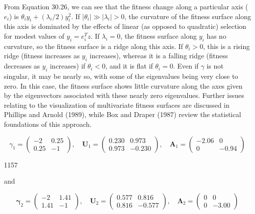 \documentclass{article}
\begin{document}
From Equation 30.26, we can see that the fitness change along a particular axis ( $ e_i $) is  $ \theta_i y_i + (\lambda_i / 2) y_i^2 $. If  $ |\theta_i| \gg |\lambda_i| > 0 $, the curvature of the fitness surface along this axis is dominated by the effects of linear (as opposed to quadratic) selection for modest values of  $ y_i = e_i^T z $. If  $ \lambda_i = 0 $, the fitness surface along  $ y_i $ has no curvature, so the fitness surface is a ridge along this axis. If  $ \theta_i > 0 $, this is a rising ridge (fitness increases as  $ y_i $ increases), whereas it is a falling ridge (fitness decreases as  $ y_i $ increases) if  $ \theta_i < 0 $, and it is flat if  $ \theta_i = 0 $. Even if  $ \gamma $ is not singular, it may be nearly so, with some of the eigenvalues being very close to zero. In this case, the fitness surface shows little curvature along the axes given by the eigenvectors associated with these nearly zero eigenvalues. Further issues relating to the visualization of multivariate fitness surfaces are discussed in Phillips and Arnold (1989), while Box and Draper (1987) review the statistical foundations of this approach.

\begin{equation}
\gamma_{1}=\begin{pmatrix}{{{-2}}}&{{{0.25}}} \\{{{0.25}}}&{{{-1}}}\end{pmatrix},\quad\mathbf{U}_{1}=\begin{pmatrix}{{{0.230}}}&{{{0.973}}} \\{{{0.973}}}&{{{-0.230}}}\end{pmatrix},\quad\mathbf{A}_{1}=\begin{pmatrix}{{{-2.06}}}&{{{0}}} \\{{{0}}}&{{{-0.94}}}\end{pmatrix}
\end{equation}

1157

and

\begin{equation}
\boldsymbol{\gamma}_{2}=\begin{pmatrix}{{{-2}}}&{{{1.41}}} \\{{{1.41}}}&{{{-1}}}\end{pmatrix},\quad\mathbf{U}_{2}=\begin{pmatrix}{{{0.577}}}&{{{0.816}}} \\{{{0.816}}}&{{{-0.577}}}\end{pmatrix},\quad\boldsymbol{\Lambda}_{2}=\begin{pmatrix}{{{0}}}&{{{0}}} \\{{{0}}}&{{{-3.00}}}\end{pmatrix}
\end{equation}
\end{document}
